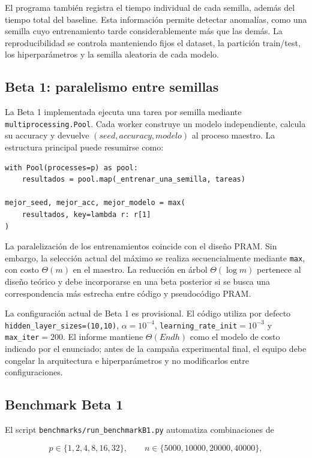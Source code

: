 \documentclass[11pt,a4paper]{article}
\begin{document}
El programa también registra el tiempo individual de cada semilla, además del tiempo
total del baseline. Esta información permite detectar anomalías, como una semilla cuyo
entrenamiento tarde considerablemente más que las demás. La reproducibilidad se controla
manteniendo fijos el dataset, la partición train/test, los hiperparámetros y la semilla
aleatoria de cada modelo.

\subsection{Beta 1: paralelismo entre semillas}

La Beta 1 implementada ejecuta una tarea por semilla mediante
\texttt{multiprocessing.Pool}. Cada worker construye un modelo independiente, calcula
su accuracy y devuelve $(seed,accuracy,modelo)$ al proceso maestro. La estructura
principal puede resumirse como:

\begin{lstlisting}
with Pool(processes=p) as pool:
    resultados = pool.map(_entrenar_una_semilla, tareas)

mejor_seed, mejor_acc, mejor_modelo = max(
    resultados, key=lambda r: r[1]
)
\end{lstlisting}

La paralelización de los entrenamientos coincide con el diseño PRAM. Sin embargo, la
selección actual del máximo se realiza secuencialmente mediante \texttt{max}, con costo
$\Theta(m)$ en el maestro. La reducción en árbol $\Theta(\log m)$ pertenece al diseño
teórico y debe incorporarse en una beta posterior si se busca una correspondencia más
estrecha entre código y pseudocódigo PRAM.

La configuración actual de Beta 1 es provisional. El código utiliza por defecto
\texttt{hidden\_layer\_sizes=(10,10)}, $\alpha=10^{-4}$,
\texttt{learning\_rate\_init}$=10^{-3}$ y \texttt{max\_iter}$=200$. El informe mantiene
$\Theta(E n d h)$ como el modelo de costo indicado por el enunciado; antes de la campaña
experimental final, el equipo debe congelar la arquitectura e hiperparámetros y no
modificarlos entre configuraciones.

\subsection{Benchmark Beta 1}

El script \texttt{benchmarks/run\_benchmarkB1.py} automatiza combinaciones de

\begin{equation}
    p\in\{1,2,4,8,16,32\},\qquad
    n\in\{5000,10000,20000,40000\},
\end{equation}
\end{document}
